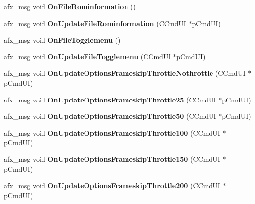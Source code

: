 \begin{DoxyCompactItemize}
\mbox{\label{class_main_wnd_a81e882a9db84a84f2507a63161b5bc4c}} 
afx\+\_\+msg void {\bfseries On\+File\+Rominformation} ()
\item 
\mbox{\label{class_main_wnd_ad95c3d153c3dc0faac385a6b765853c8}} 
afx\+\_\+msg void {\bfseries On\+Update\+File\+Rominformation} (C\+Cmd\+UI $\ast$p\+Cmd\+UI)
\item 
\mbox{\label{class_main_wnd_ad376d27bd5299961827dda9d8700a375}} 
afx\+\_\+msg void {\bfseries On\+File\+Togglemenu} ()
\item 
\mbox{\label{class_main_wnd_aa5c872c99d1d656c74971eb67f4a2b97}} 
afx\+\_\+msg void {\bfseries On\+Update\+File\+Togglemenu} (C\+Cmd\+UI $\ast$p\+Cmd\+UI)
\item 
\mbox{\label{class_main_wnd_a257268a463135c72751be8111df48fae}} 
afx\+\_\+msg void {\bfseries On\+Update\+Options\+Frameskip\+Throttle\+Nothrottle} (C\+Cmd\+UI $\ast$p\+Cmd\+UI)
\item 
\mbox{\label{class_main_wnd_ac92a00f1057a61ae756c93004fb42938}} 
afx\+\_\+msg void {\bfseries On\+Update\+Options\+Frameskip\+Throttle25} (C\+Cmd\+UI $\ast$p\+Cmd\+UI)
\item 
\mbox{\label{class_main_wnd_a1a3e6740086e386c8953eed9c59d005d}} 
afx\+\_\+msg void {\bfseries On\+Update\+Options\+Frameskip\+Throttle50} (C\+Cmd\+UI $\ast$p\+Cmd\+UI)
\item 
\mbox{\label{class_main_wnd_adb8330ee73130cb9c4dd676a9da387b9}} 
afx\+\_\+msg void {\bfseries On\+Update\+Options\+Frameskip\+Throttle100} (C\+Cmd\+UI $\ast$p\+Cmd\+UI)
\item 
\mbox{\label{class_main_wnd_a22dde850fc137ea95bd63898d35086d1}} 
afx\+\_\+msg void {\bfseries On\+Update\+Options\+Frameskip\+Throttle150} (C\+Cmd\+UI $\ast$p\+Cmd\+UI)
\item 
\mbox{\label{class_main_wnd_a1e2ba1a5a6a690c4a2cd946f9621dbd2}} 
afx\+\_\+msg void {\bfseries On\+Update\+Options\+Frameskip\+Throttle200} (C\+Cmd\+UI $\ast$p\+Cmd\+UI)

\end{DoxyCompactItemize}
